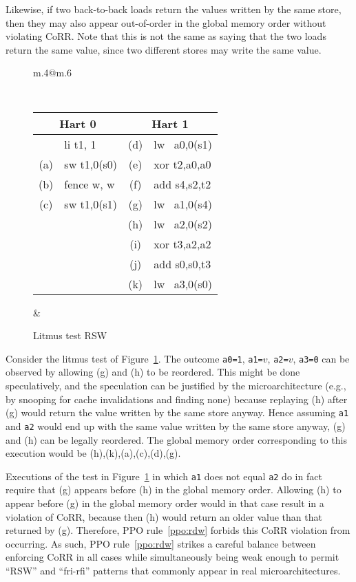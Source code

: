 Likewise, if two back-to-back loads return the values written by the same store, then they may also appear out-of-order in the global memory order without violating CoRR.  Note that this is not the same as saying that the two loads return the same value, since two different stores may write the same value.

\begin{figure}[h!]
  \centering
  \begin{tabular}{m{.4\linewidth}@{\qquad\quad}m{.6\linewidth}}
  {
    \tt\small
    \begin{tabular}{cl||cl}
    \multicolumn{2}{c}{Hart 0} & \multicolumn{2}{c}{Hart 1} \\
    \hline
          & li t1, 1    & (d) & lw~ a0,0(s1) \\
      (a) & sw t1,0(s0) & (e) & xor t2,a0,a0 \\
      (b) & fence w, w  & (f) & add s4,s2,t2 \\
      (c) & sw t1,0(s1) & (g) & lw~ a1,0(s4) \\
          &             & (h) & lw~ a2,0(s2) \\
          &             & (i) & xor t3,a2,a2 \\
          &             & (j) & add s0,s0,t3 \\
          &             & (k) & lw~ a3,0(s0) \\
    \end{tabular}
  }
  &
  
   \end{tabular}
  \caption{Litmus test RSW}
  \label{fig:litmus:rsw}
\end{figure}

Consider the litmus test of Figure~\ref{fig:litmus:rsw}.
The outcome {\tt a0=1}, {\tt a1=$v$},  {\tt a2=$v$}, {\tt a3=0} can be observed by allowing (g) and (h) to be reordered.  This might be done speculatively, and the speculation can be justified by the microarchitecture (e.g., by snooping for cache invalidations and finding none) because replaying (h) after (g) would return the value written by the same store anyway.
Hence assuming {\tt a1} and {\tt a2} would end up with the same value written by the same store anyway, (g) and (h) can be legally reordered.
The global memory order corresponding to this execution would be (h),(k),(a),(c),(d),(g).

Executions of the test in Figure~\ref{fig:litmus:rsw} in which {\tt a1} does not equal {\tt a2} do in fact require that (g) appears before (h) in the global memory order.
Allowing (h) to appear before (g) in the global memory order would in that case result in a violation of CoRR, because then (h) would return an older value than that returned by (g).
Therefore, PPO rule~\ref{ppo:rdw} forbids this CoRR violation from occurring.
As such, PPO rule~\ref{ppo:rdw} strikes a careful balance between enforcing CoRR in all cases while simultaneously being weak enough to permit ``RSW'' and ``fri-rfi'' patterns that commonly appear in real microarchitectures.

